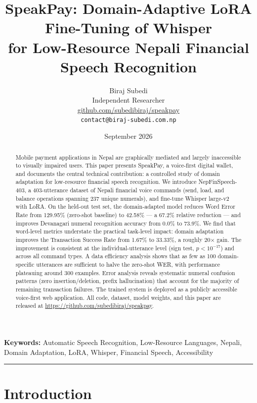 \documentclass[11pt,a4paper]{article}
\title{
    \vspace{-1cm}
    {\LARGE \textbf{SpeakPay: Domain-Adaptive LoRA Fine-Tuning of Whisper\\[4pt]
    for Low-Resource Nepali Financial Speech Recognition}}
}
\author{
    Biraj Subedi \\
    \small Independent Researcher \\
    \small \href{https://github.com/subedibiraj/speakpay}{github.com/subedibiraj/speakpay} \\
    \small \texttt{contact@biraj-subedi.com.np}
}
\date{September 2026}
\begin{document}
\maketitle

\begin{abstract}
Mobile payment applications in Nepal are graphically mediated and largely
inaccessible to visually impaired users. This paper presents SpeakPay, a
voice-first digital wallet, and documents the central technical
contribution: a controlled study of domain adaptation for low-resource
financial speech recognition. We introduce NepFinSpeech-403, a 403-utterance
dataset of Nepali financial voice commands (send, load, and balance
operations spanning 237 unique numerals), and fine-tune Whisper large-v2
with LoRA. On the held-out test set, the domain-adapted model reduces
Word Error Rate from 129.95\% (zero-shot baseline) to 42.58\% --- a 67.2\%
relative reduction --- and improves Devanagari numeral recognition accuracy
from 0.0\% to 73.9\%. We find that word-level metrics understate the
practical task-level impact: domain adaptation improves the Transaction
Success Rate from 1.67\% to 33.33\%, a roughly 20$\times$ gain. The
improvement is consistent at the individual-utterance level (sign test,
$p < 10^{-17}$) and across all command types. A data efficiency analysis
shows that as few as 100 domain-specific utterances are sufficient to
halve the zero-shot WER, with performance plateauing around 300 examples.
Error analysis reveals systematic numeral confusion patterns (zero
insertion/deletion, prefix hallucination) that account for the majority
of remaining transaction failures. The trained system is deployed as a
publicly accessible voice-first web application. All code, dataset, model
weights, and this paper are released at
\url{https://github.com/subedibiraj/speakpay}.
\end{abstract}

\vspace{0.3em}
\noindent\textbf{Keywords:} Automatic Speech Recognition, Low-Resource Languages, Nepali, Domain Adaptation, LoRA, Whisper, Financial Speech, Accessibility

\vspace{0.5em}
\hrule
\vspace{1em}

\section{Introduction}
\end{document}
